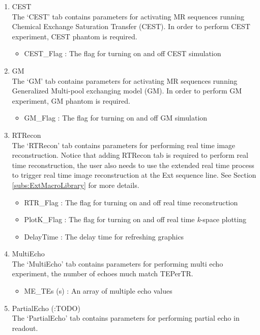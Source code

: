 \documentclass{book}%
\begin{document}
\begin{enumerate}
	\item CEST \\
	The `CEST' tab contains parameters for activating MR sequences running Chemical Exchange Saturation Transfer (CEST). In order to perform CEST experiment, CEST phantom is required.
	\begin{itemize}
		\item CEST\_Flag : The flag for turning on and off CEST simulation
	\end{itemize}
	
	\item GM \\
	The `GM' tab contains parameters for activating MR sequences running Generalized Multi-pool exchanging model (GM). In order to perform GM experiment, GM phantom is required.
	\begin{itemize}
		\item GM\_Flag : The flag for turning on and off GM simulation
	\end{itemize}
	
	\item RTRecon \\
	The `RTRecon' tab contains parameters for performing real time image reconstruction. Notice that adding RTRecon tab is required to perform real time reconstruction, the user also needs to use the extended real time process to trigger real time image reconstruction at the Ext sequence line. See Section \ref{subs:ExtMacroLibrary} for more details.
	\begin{itemize}
		\item RTR\_Flag : The flag for turning on and off real time reconstruction
		\item PlotK\_Flag : The flag for turning on and off real time \textit{k}-space plotting
		\item DelayTime : The delay time for refreshing graphics
	\end{itemize}
		
  \item MultiEcho \\
	The `MultiEcho' tab contains parameters for performing multi echo experiment, the number of echoes much match TEPerTR.
		\begin{itemize}
			\item ME\_TEs (s) : An array of multiple echo values
		\end{itemize}
	
	\item PartialEcho (:TODO) \\
	The `PartialEcho' tab contains parameters for performing partial echo in readout.
	

\end{enumerate}
\end{document}
